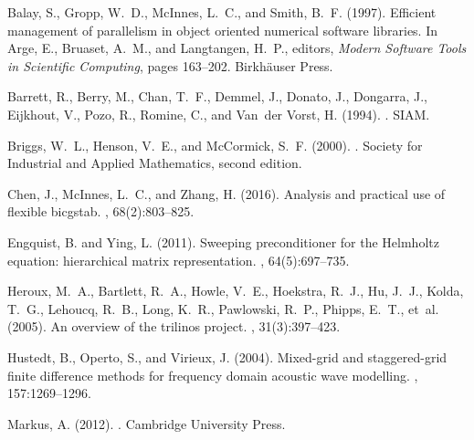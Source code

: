 \documentclass[10pt]{article}
\begin{document}
\newcommand{\SortNoop}[1]{}
\begin{thebibliography}{}

Balay, S., Gropp, W.~D., McInnes, L.~C., and Smith, B.~F. (1997).
\newblock Efficient management of parallelism in object oriented numerical
  software libraries.
\newblock In Arge, E., Bruaset, A.~M., and Langtangen, H.~P., editors, {\em
  Modern Software Tools in Scientific Computing}, pages 163--202.
  Birkh{\"{a}}user Press.

Barrett, R., Berry, M., Chan, T.~F., Demmel, J., Donato, J., Dongarra, J.,
  Eijkhout, V., Pozo, R., Romine, C., and Van~der Vorst, H. (1994).
.
\newblock SIAM.

Briggs, W.~L., Henson, V.~E., and McCormick, S.~F. (2000).
.
\newblock Society for Industrial and Applied Mathematics, second edition.

Chen, J., McInnes, L.~C., and Zhang, H. (2016).
\newblock Analysis and practical use of flexible bicgstab.
, 68(2):803--825.

Engquist, B. and Ying, L. (2011).
\newblock Sweeping preconditioner for the {H}elmholtz equation: hierarchical
  matrix representation.
, 64(5):697--735.

Heroux, M.~A., Bartlett, R.~A., Howle, V.~E., Hoekstra, R.~J., Hu, J.~J.,
  Kolda, T.~G., Lehoucq, R.~B., Long, K.~R., Pawlowski, R.~P., Phipps, E.~T.,
  et~al. (2005).
\newblock An overview of the trilinos project.
,
  31(3):397--423.

Hustedt, B., Operto, S., and Virieux, J. (2004).
\newblock Mixed-grid and staggered-grid finite difference methods for frequency
  domain acoustic wave modelling.
, 157:1269--1296.

Markus, A. (2012).
.
\newblock Cambridge University Press.


\end{thebibliography}
\end{document}
